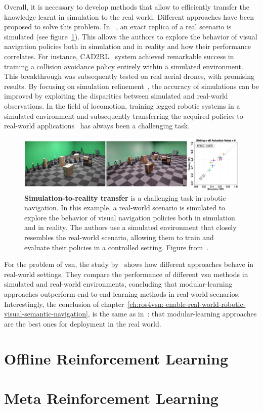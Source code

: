 Overall, it is necessary to develop methods that allow to efficiently transfer the knowledge learnt in simulation to the real world.
Different approaches have been proposed to solve this problem.
In ~\cite{kadian2020}, an exact replica of a real scenario is simulated (see figure~\ref{fig:sim2real}).
This allows the authors to explore the behavior of visual navigation policies both in simulation and in reality and how their performance correlates.
For instance, CAD2RL~\cite{sadeghiCAD2RLRealSingleImage2017} system achieved remarkable success in training a collision avoidance policy entirely within a simulated environment.
This breakthrough was subsequently tested on real aerial drones, with promising results.
By focusing on simulation refinement~\cite{Son2020}, the accuracy of simulations can be improved by exploiting the disparities between simulated and real-world observations.
In the field of locomotion, training legged robotic systems in a simulated environment and subsequently transferring the acquired policies to real-world applications~\cite{Hwangbo_2019, agarwal2022} has always been a challenging task.

\begin{figure}
    \includegraphics[width=\textwidth]{figures/related_work/sim2real}
    \caption{\textbf{Simulation-to-reality transfer} is a challenging task in robotic navigation.
    In this example, a real-world scenario is simulated to explore the behavior of visual navigation policies both in simulation and in reality.
    The authors use a simulated environment that closely resembles the real-world scenario, allowing them to train and evaluate their policies in a controlled setting.
    Figure from~\cite{kadian2020}.}
    \label{fig:sim2real}
\end{figure}

For the problem of \acrshort{vsn}, the study by~\cite{gervet2022} shows how different approaches behave in real-world settings.
They compare the performance of different \acrshort{vsn} methods in simulated and real-world environments, concluding that modular-learning approaches outperform end-to-end learning methods in real-world scenarios.
Interestingly, the conclusion of chapter~\ref{ch:ros4vsn:-enable-real-world-robotic-visual-semantic-navigation}, is the same as in~\cite{gervet2022}: that modular-learning approaches are the best ones for deployment in the real world.

\section{Offline Reinforcement Learning}\label{sec:offline-reinforcement-learning}

\section{Meta Reinforcement Learning}\label{sec:meta-reinforcement-learning}
